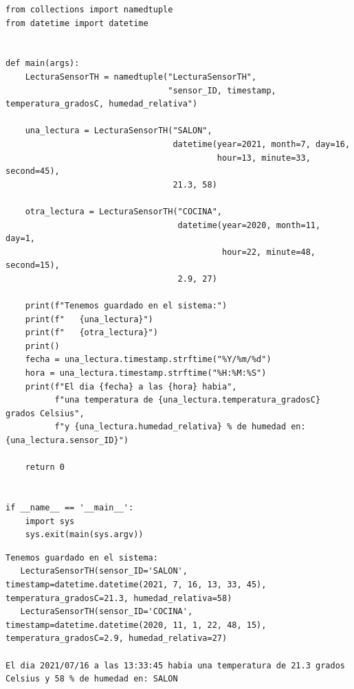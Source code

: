 \documentclass[spanish,12pt,a4paper,final,oneside]{book}
\begin{document}
\begin{lstlisting}[frame=single, caption=lenguaje Python]
from collections import namedtuple
from datetime import datetime


def main(args):
    LecturaSensorTH = namedtuple("LecturaSensorTH",
                                 "sensor_ID, timestamp, temperatura_gradosC, humedad_relativa")

    una_lectura = LecturaSensorTH("SALON",
                                  datetime(year=2021, month=7, day=16,
                                           hour=13, minute=33, second=45),
                                  21.3, 58)

    otra_lectura = LecturaSensorTH("COCINA",
                                   datetime(year=2020, month=11, day=1,
                                            hour=22, minute=48, second=15),
                                   2.9, 27)

    print(f"Tenemos guardado en el sistema:")
    print(f"   {una_lectura}")
    print(f"   {otra_lectura}")
    print()
    fecha = una_lectura.timestamp.strftime("%Y/%m/%d")
    hora = una_lectura.timestamp.strftime("%H:%M:%S")
    print(f"El dia {fecha} a las {hora} habia",
          f"una temperatura de {una_lectura.temperatura_gradosC} grados Celsius",
          f"y {una_lectura.humedad_relativa} % de humedad en: {una_lectura.sensor_ID}")

    return 0


if __name__ == '__main__':
    import sys
    sys.exit(main(sys.argv))
\end{lstlisting}

\begin{lstlisting}[frame=single]
Tenemos guardado en el sistema:
   LecturaSensorTH(sensor_ID='SALON', timestamp=datetime.datetime(2021, 7, 16, 13, 33, 45), temperatura_gradosC=21.3, humedad_relativa=58)
   LecturaSensorTH(sensor_ID='COCINA', timestamp=datetime.datetime(2020, 11, 1, 22, 48, 15), temperatura_gradosC=2.9, humedad_relativa=27)

El dia 2021/07/16 a las 13:33:45 habia una temperatura de 21.3 grados Celsius y 58 % de humedad en: SALON
\end{lstlisting}
\end{document}
